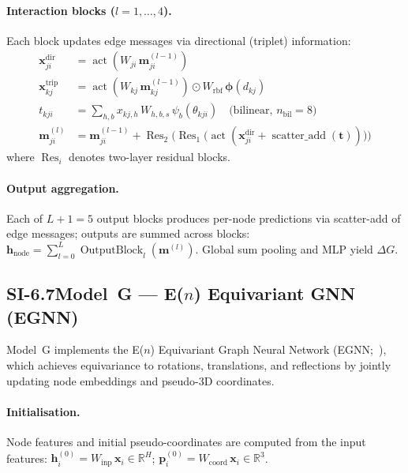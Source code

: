 \documentclass[11pt]{article}
\begin{document}
\paragraph{Interaction blocks ($l = 1, \ldots, 4$).}
Each block updates edge messages via directional (triplet) information:
\begin{align}
  \mathbf{x}_{ji}^{\mathrm{dir}} &= \operatorname{act}(W_{ji}\, \mathbf{m}_{ji}^{(l-1)})
  \\[3pt]
  \mathbf{x}_{kj}^{\mathrm{trip}} &= \operatorname{act}(W_{kj}\, \mathbf{m}_{kj}^{(l-1)})
  \odot W_{\mathrm{rbf}}\, \boldsymbol{\phi}(d_{kj})
  \\[3pt]
  t_{kji} &= \sum_{h,b} x_{kj,h}\, W_{h,b,s}\, \psi_b(\theta_{kji})
  \quad \text{(bilinear, $n_{\mathrm{bil}} = 8$)}
  \\[3pt]
  \mathbf{m}_{ji}^{(l)} &= \mathbf{m}_{ji}^{(l-1)}
  + \operatorname{Res}_2\!\bigl(\operatorname{Res}_1\!\bigl(
    \operatorname{act}(\mathbf{x}_{ji}^{\mathrm{dir}}
    + \operatorname{scatter\_add}(\mathbf{t}))
  \bigr)\bigr)
\end{align}
where $\operatorname{Res}_i$ denotes two-layer residual blocks.

\paragraph{Output aggregation.}
Each of $L+1 = 5$ output blocks produces per-node predictions via
scatter-add of edge messages; outputs are summed across blocks:
$\mathbf{h}_{\mathrm{node}} = \sum_{l=0}^{L}
\operatorname{OutputBlock}_l(\mathbf{m}^{(l)})$.
Global sum pooling and MLP yield $\Delta G$.

\subsection*{SI-6.7\quad Model~G --- E($n$) Equivariant GNN (EGNN)}
\label{si:model_g}

Model~G implements the E($n$) Equivariant Graph Neural Network
(EGNN;~\cite{satorras2021equivariant}), which achieves equivariance to
rotations, translations, and reflections by jointly updating node
embeddings and pseudo-3D coordinates.

\paragraph{Initialisation.}
Node features and initial pseudo-coordinates are computed from the
input features:
$\mathbf{h}_i^{(0)} = W_{\mathrm{inp}}\, \mathbf{x}_i \in \mathbb{R}^{H}$;
$\mathbf{p}_i^{(0)} = W_{\mathrm{coord}}\, \mathbf{x}_i \in \mathbb{R}^{3}$.
\end{document}
